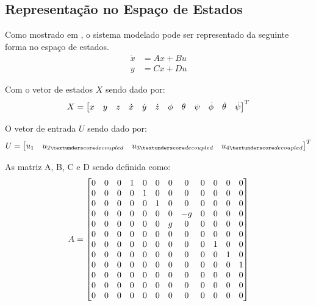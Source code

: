\subsection{Representação no Espaço de Estados}
\label{subsec:sistemas-quadcopter-state-spaces}

Como mostrado em \cite[p.~63]{Balas2007}, o sistema modelado pode ser representado da seguinte forma no espaço de estados.
\begin{align} \label{eq:space_state_equation_quadcopter}
	\dot{x} &= Ax + Bu \nonumber \\
	y		&= Cx + Du
\end{align}

Com o vetor de estados $X$ sendo dado por:
\begin{equation*}
X=
\left[ \begin{array}{@{}*{12}{c}@{}}
     x & y & z & \dot{x} & \dot{y} & \dot{z} & \phi & \theta & \psi & \dot{\phi} & \dot{\theta} & \dot{\psi}\\
\end{array} \right]^T
\end{equation*}

O vetor de entrada $U$ sendo dado por:
\[ 
	U =
	\begin{bmatrix}
		u_1 & 
		u_{2\textunderscore decoupled} &
		u_{3\textunderscore decoupled} &
		u_{4\textunderscore decoupled}
	\end{bmatrix}^T
\]

As matriz A, B, C e D sendo definida como:
\begin{equation*}
A =
\left[ \begin{array}{@{}*{12}{c}@{}}
     0 & 0 & 0 & 1 & 0 & 0 & 0 & 0  & 0 & 0 & 0 & 0 \\
     0 & 0 & 0 & 0 & 1 & 0 & 0 & 0  & 0 & 0 & 0 & 0 \\
     0 & 0 & 0 & 0 & 0 & 1 & 0 & 0  & 0 & 0 & 0 & 0 \\
     0 & 0 & 0 & 0 & 0 & 0 & 0 & -g & 0 & 0 & 0 & 0 \\
     0 & 0 & 0 & 0 & 0 & 0 & g & 0  & 0 & 0 & 0 & 0 \\
     0 & 0 & 0 & 0 & 0 & 0 & 0 & 0  & 0 & 0 & 0 & 0 \\
     0 & 0 & 0 & 0 & 0 & 0 & 0 & 0  & 0 & 1 & 0 & 0 \\
     0 & 0 & 0 & 0 & 0 & 0 & 0 & 0  & 0 & 0 & 1 & 0 \\
     0 & 0 & 0 & 0 & 0 & 0 & 0 & 0  & 0 & 0 & 0 & 1 \\
     0 & 0 & 0 & 0 & 0 & 0 & 0 & 0  & 0 & 0 & 0 & 0 \\
     0 & 0 & 0 & 0 & 0 & 0 & 0 & 0  & 0 & 0 & 0 & 0 \\
     0 & 0 & 0 & 0 & 0 & 0 & 0 & 0  & 0 & 0 & 0 & 0 \\
\end{array}\right]
\end{equation*}

